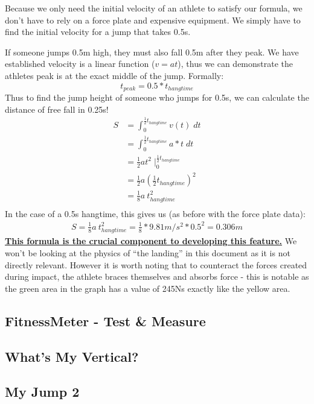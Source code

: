 Because we only need the initial velocity of an athlete to satisfy our formula,
we don't have to rely on a force plate and expensive equipment.
We simply have to find the initial velocity for a jump that takes 0.5s.
\par
If someone jumps 0.5m high, they must also fall 0.5m after they peak. We have established
velocity is a linear function ($v=at$), thus we can demonstrate the athletes peak
is at the exact middle of the jump. Formally:
\vspace{-3mm}
\[
	\displaystyle
	t_{peak} = 0.5 * t_{hangtime}	
\]
Thus to find the jump height of someone who jumps for 0.5s, we can calculate
the distance of free fall in 0.25s!
\[
	\displaystyle
	\begin{aligned}
	S &= \int_0^{\frac{1}{2} t_{hangtime}} v(t) \; dt \\
	&= \int_0^{\frac{1}{2} t_{hangtime}} a * t \; dt \\
	&= \frac{1}{2} a t^2 \; \bigg|_0^{\frac{1}{2}t_{hangtime}} \\
	&= \frac{1}{2} a \left( \frac{1}{2} t_{hangtime} \right)^2 \\
	&= \frac{1}{8} a \: t_{hangtime}^2 \\
	\end{aligned}	
\]
In the case of a 0.5s hangtime, this gives us (as before with the force plate data):
\[
\begin{aligned}
	S = \frac{1}{8} a \: t_{hangtime}^2 = \frac{1}{8} * 9.81m/s^2 * 0.5^2 = 0.306m
\end{aligned}	
\]
\textbf{\underline{This formula is the crucial component to developing this feature.}} 
We won't be looking
at the physics of ``the landing'' in this document as it is not directly relevant.
However it is worth noting that to counteract the forces created during impact,
the athlete braces themselves and absorbs force - this is notable as the green area
in the graph has a value of 245Ns exactly like the yellow area.
\pagebreak

\subsection{FitnessMeter - Test \& Measure}
\label{research:fitness-meter}
\subsection{What's My Vertical?}
\label{research:whats-my-vert}
\subsection{My Jump 2}
\label{research:my-jump}


